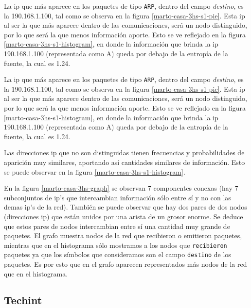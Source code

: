 \documentclass[final,inline,a4paper,narroweqnarray]{ieee}
\let\Oldsubsection\subsection
\renewcommand{\subsection}{\FloatBarrier\Oldsubsection}
\begin{document}
  La ip que más aparece en los paquetes de tipo \texttt{ARP}, dentro
  del campo \textit{destino}, es la 190.168.1.100, tal como se observa
  en la figura \ref{marto-casa-3hs-s1-pie}. Esta ip al ser la que más
  aparece dentro de las comunicaciones, será un nodo distinguido, por
  lo que será la que menos información aporte. Esto se ve reflejado en
  la figura \ref{marto-casa-3hs-s1-histogram}, en donde la información
  que brinda la ip 190.168.1.100 (representada como A) queda por
  debajo de la entropía de la fuente, la cual es 1.24.
  
  La ip que más aparece en los paquetes de tipo \texttt{ARP}, dentro del
  campo \textit{destino}, es la 190.168.1.100, tal como se observa en la
  figura \ref{marto-casa-3hs-s1-pie}. Esta ip al ser la que más aparece
  dentro de las comunicaciones, será un nodo distinguido, por lo que será la
  que menos información aporte. Esto se ve reflejado en la figura
  \ref{marto-casa-3hs-s1-histogram}, en donde la información que brinda la
  ip 190.168.1.100 (representada como A) queda por debajo de la entropía de
  la fuente, la cual es 1.24.  

  Las direcciones ip que no son distinguidas tienen frecuencias y
  probabilidades de aparición muy similares, aportando así
  cantidades similares de información. Esto se puede observar en la figura
  \ref{marto-casa-3hs-s1-histogram}.

  En la figura \ref{marto-casa-3hs-graph} se observan 7 componentes conexas
  (hay 7 subconjuntos de ip's que intercambian información sólo entre sí y
  no con las demas ip's de la red). También se puede observar que hay dos
  pares de dos
  nodos (direcciones ip) que están unidos por una arista de un grosor
  enorme. Se deduce que estos pares de  nodos intercambian entre sí una cantidad
  muy grande de paquetes.
  El grafo muestra nodos de la red que recibieron o emitieron paquetes,
  mientras que en el histograma sólo mostramos a los nodos que
  \texttt{recibieron} paquetes ya que los símbolos que consideramos son el
  campo \texttt{destino} de los paquetes. Es por esto que en el grafo
  aparecen representados más nodos de la red que en el histograma.  

  \subsection{Techint}
\end{document}
